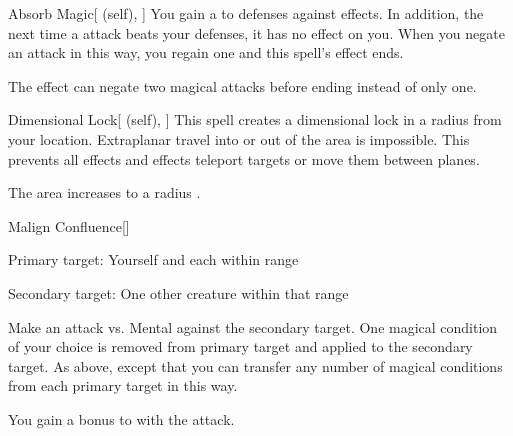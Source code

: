 \lowercase{\hypertarget{spell:Absorb Magic}{}}\label{spell:Absorb Magic}
\begin{attuneability}[Rank 6]{\hypertarget{spell:Absorb Magic}{Absorb Magic}}[ (self), ]
You gain a   to defenses against  effects.
In addition, the next time a  attack beats your defenses, it has no effect on you.
When you negate an attack in this way, you regain one  and this spell's effect ends.

\rankline
{} The effect can negate two magical attacks before ending instead of only one.
\end{attuneability}
\vspace{0.25em}



\lowercase{\hypertarget{spell:Dimensional Lock}{}}\label{spell:Dimensional Lock}
\begin{attuneability}[Rank 6]{\hypertarget{spell:Dimensional Lock}{Dimensional Lock}}[ (self), ]
\targetrule
This spell creates a dimensional lock in a \arealarge radius  from your location.
Extraplanar travel into or out of the area is impossible.
This prevents all  effects and effects teleport targets or move them between planes.

\rankline
{} The area increases to a \areahuge radius .
\end{attuneability}
\vspace{0.25em}



\lowercase{\hypertarget{spell:Malign Confluence}{}}\label{spell:Malign Confluence}
\begin{freeability}[Rank 6]{\hypertarget{spell:Malign Confluence}{Malign Confluence}}[]

Primary target: Yourself and each  within \rngmed range
\par\noindent
Secondary target: One other creature within that range

Make an attack vs. Mental against the secondary target.
\hit One magical condition of your choice is removed from primary target and applied to the secondary target.
\crit As above, except that you can transfer any number of magical conditions from each primary target in this way.

\rankline
{} You gain a  bonus to  with the attack.
\end{freeability}
\vspace{0.25em}



